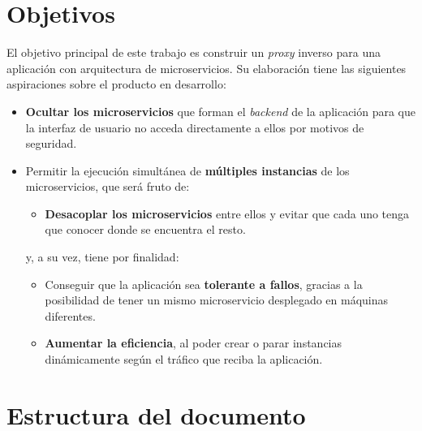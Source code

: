\documentclass[11pt,spanish,listoffigures]{tfgetsinf}
\begin{document}

	\section{Objetivos}

El objetivo principal de este trabajo es construir un \emph{proxy} inverso para una aplicación con arquitectura de microservicios. Su elaboración tiene las siguientes aspiraciones sobre el producto en desarrollo:

\begin{itemize}

	\item \textbf{Ocultar los microservicios} que forman el \emph{backend} de la aplicación para que la interfaz de usuario no acceda directamente a ellos por motivos de seguridad.

	\item Permitir la ejecución simultánea de \textbf{múltiples instancias} de los microservicios, que será fruto de:

	\begin{itemize}

		\item \textbf{Desacoplar los microservicios} entre ellos y evitar que cada uno tenga que conocer donde se encuentra el resto.

	\end{itemize}	

	y, a su vez, tiene por finalidad:

	\begin{itemize}

		\item Conseguir que la aplicación sea \textbf{tolerante a fallos}, gracias a la posibilidad de tener un mismo microservicio desplegado en máquinas diferentes.

		\item \textbf{Aumentar la eficiencia}, al poder crear o parar instancias dinámicamente según el tráfico que reciba la aplicación.

	\end{itemize}

\end{itemize}


	\section{Estructura del documento}
\end{document}

